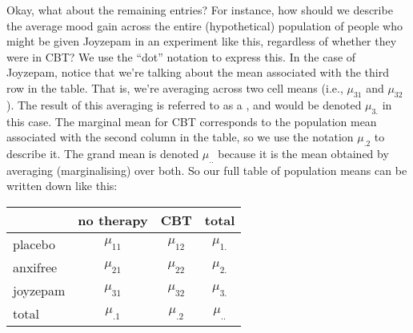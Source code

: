 Okay, what about the remaining entries? For instance, how should we describe the average mood gain across the entire (hypothetical) population of people who might be given Joyzepam in an experiment like this, regardless of whether they were in CBT? We use the ``dot'' notation to express this. In the case of Joyzepam, notice that we're talking about the mean associated with the third row in the table. That is, we're averaging across two cell means (i.e., $\mu_{31}$ and $\mu_{32}$). The result of this averaging is referred to as a , and would be denoted $\mu_{3.}$ in this case. The marginal mean for CBT corresponds to the population mean associated with the second column in the table, so we use the notation $\mu_{.2}$ to describe it. The grand mean is denoted $\mu_{..}$ because it is the mean obtained by averaging (marginalising) over both. So our full table of population means can be written down like this:
\begin{center}
\begin{tabular}{l|cc|c}
& no therapy & CBT & total \\ \hline
placebo & $\mu_{11}$ & $\mu_{12}$ & $\mu_{1.}$  \\
anxifree & $\mu_{21}$ & $\mu_{22}$ & $\mu_{2.}$  \\
joyzepam & $\mu_{31}$ &$\mu_{32}$ & $\mu_{3.}$ \\ \hline
total & $\mu_{.1}$ & $\mu_{.2}$  &  $\mu_{..}$
\end{tabular}
\end{center}

